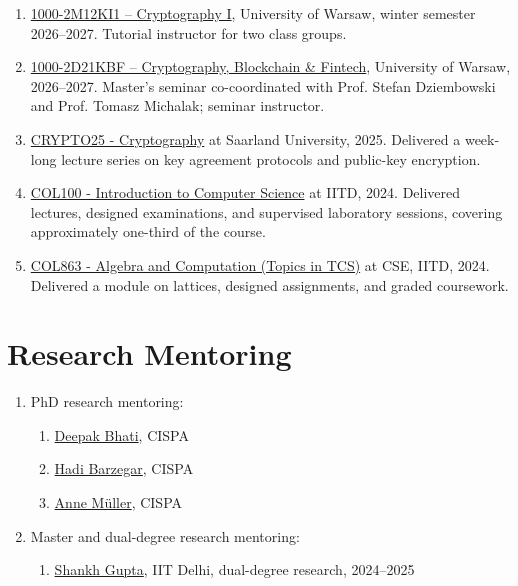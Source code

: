 \documentclass[margin]{res} %
\begin{document}
\begin{resume}
\begin{enumerate}
    \item \href{https://informatorects.uw.edu.pl/en/courses/view?prz_kod=1000-2M12KI1}{1000-2M12KI1 -- Cryptography I}, University of Warsaw, winter semester 2026--2027. Tutorial instructor for two class groups.

    \item \href{https://informatorects.uw.edu.pl/en/courses/view?prz_kod=1000-2D21KBF}{1000-2D21KBF -- Cryptography, Blockchain \& Fintech}, University of Warsaw, 2026--2027. Master's seminar co-coordinated with Prof. Stefan Dziembowski and Prof. Tomasz Michalak; seminar instructor.

    \item \href{https://cms.cispa.saarland/crypto25/}{CRYPTO25 - Cryptography} at Saarland University, 2025. Delivered a week-long lecture series on key agreement protocols and public-key encryption.
    
    \item \href{https://kumarmadhukar.github.io/courses/col100-summer24/index.html}{COL100 - Introduction to Computer Science} at IITD, 2024. Delivered lectures, designed examinations, and supervised laboratory sessions, covering approximately one-third of the course.
    
    \item \href{https://sites.google.com/view/nikhilbalaji/holi2024}{COL863 - Algebra and Computation (Topics in TCS)} at CSE, IITD, 2024. Delivered a module on lattices, designed assignments, and graded coursework.
\end{enumerate}

\section{Research Mentoring}
\begin{enumerate}
    \item PhD research mentoring:
        \begin{enumerate}
            \item \href{https://cispa.de/en/people/c01debh}{Deepak Bhati}, CISPA

            \item \href{https://cispa.de/en/people/c01moba}{Hadi Barzegar}, CISPA

            \item \href{https://anne-me.github.io}{Anne Müller}, CISPA
        \end{enumerate}
    
    \item Master and dual-degree research mentoring: 
        \begin{enumerate}
            \item \href{https://shankhgupta.github.io}{Shankh Gupta}, IIT Delhi, dual-degree research, 2024--2025


\end{enumerate}
\end{enumerate}
\end{resume}
\end{document}

